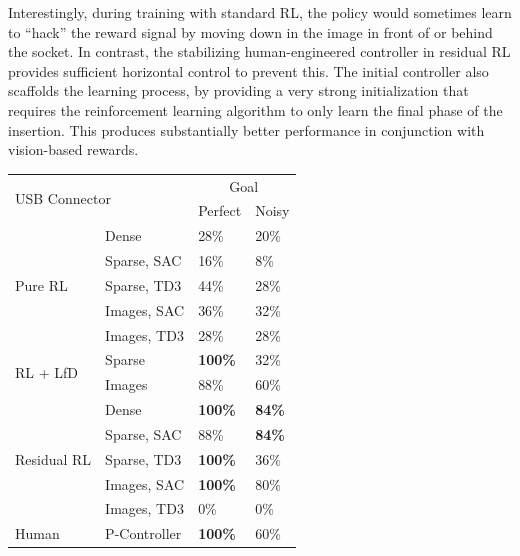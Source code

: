 Interestingly, during training with standard RL, the policy would sometimes learn to ``hack'' the reward signal by moving down in the image in front of or behind the socket. In contrast, the stabilizing human-engineered controller in residual RL provides sufficient horizontal control to prevent this. The initial controller also scaffolds the learning process, by providing a very strong initialization that requires the reinforcement learning algorithm to only learn the final phase of the insertion. This produces substantially better performance in conjunction with vision-based rewards.

\vspace{.3cm}
\begin{table}[ht!]
    \centering
\begin{minipage}[t]{.47\textwidth}
    \renewcommand{\arraystretch}{1}
    \footnotesize
    \begin{tabular}{|l|l|l|l|}
    \hline
    \multicolumn{2}{|l|}{\multirow{2}{*}{USB Connector}} & \multicolumn{2}{c|}{Goal}                                 \\ \cline{3-4} 
    \multicolumn{2}{|l|}{}                     & \multicolumn{1}{c|}{Perfect} & \multicolumn{1}{c|}{Noisy} \\ \hline \hline
    \multirow{5}{*}{Pure RL}   
     & Dense & 28\% & 20\% \\ 
     & Sparse, \;SAC & 16\% & 8\% \\ 
     & Sparse, \;TD3 & 44\% & 28\% \\ 
      & Images, SAC & 36\% & 32\% \\ 
       & Images, TD3 & 28\% & 28\% \\ \hline
    \multirow{2}{*}{RL + LfD} & Sparse &\textbf{100\%} & 32\% \\ 
     & Images & 88\% & 60\% \\ \hline
    \multirow{5}{*}{Residual RL} & Dense &\textbf{100\%} & \textbf{84\%} \\ 
     & Sparse,\: SAC & 88\% &  \textbf{84\%}\\ 
     & Sparse,\: TD3 &\textbf{100\%} & 36\% \\
     & Images, SAC & \textbf{100\%} & 80\% \\
      & Images, TD3 &  0\%& 0\%\\
      \hline
    \multirow{1}{*}{Human} & P-Controller & \textbf{100\%} & 60\% \\   \hline
    \end{tabular}

\end{minipage}
\end{table}
